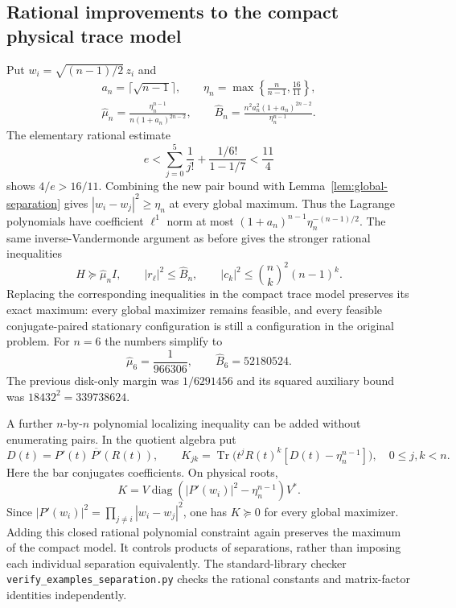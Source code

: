 \documentclass[11pt]{article}
\theoremstyle{remark}
\numberwithin{equation}{section}
\begin{document}
\subsection{Rational improvements to the compact physical trace model}
Put $w_i=\sqrt{(n-1)/2}\,z_i$ and
\[
\begin{gathered}
 a_n=\lceil\sqrt{n-1}\rceil,\qquad
 \eta_n=\max\left\{\frac n{n-1},\frac{16}{11}\right\},\\
 \widehat\mu_n=\frac{\eta_n^{n-1}}{n(1+a_n)^{2n-2}},
 \qquad
 \widehat B_n=\frac{n^2a_n^2(1+a_n)^{2n-2}}{\eta_n^{n-1}}.
\end{gathered}
\]
The elementary rational estimate
\[
 e<\sum_{j=0}^5\frac1{j!}+\frac{1/6!}{1-1/7}<\frac{11}{4}
\]
shows $4/e>16/11$. Combining the new pair bound with
Lemma~\ref{lem:global-separation} gives
$|w_i-w_j|^2\ge\eta_n$ at every global maximum.
Thus the Lagrange polynomials have coefficient $\ell^1$ norm at most
$(1+a_n)^{n-1}\eta_n^{-(n-1)/2}$.
The same inverse-Vandermonde argument as before gives the stronger
rational inequalities
\begin{equation}\label{eq:new-pair-compact-bounds}
 H\succeq\widehat\mu_n I,\qquad |r_\ell|^2\le\widehat B_n,
 \qquad |c_k|^2\le\binom nk^2(n-1)^k.
\end{equation}
Replacing the corresponding inequalities in the compact trace model
preserves its exact maximum: every global maximizer remains feasible,
and every feasible conjugate-paired stationary configuration is still
a configuration in the original problem.
For $n=6$ the numbers simplify to
\[
                  \widehat\mu_6=\frac1{966306},\qquad
                  \widehat B_6=52180524.
\]
The previous disk-only margin was $1/6291456$ and its squared
auxiliary bound was $18432^2=339738624$.

A further $n$-by-$n$ polynomial localizing inequality can be added
without enumerating pairs. In the quotient algebra put
\[
 D(t)=P'(t)\,\overline{P'}(R(t)),\qquad
 K_{jk}=\operatorname{Tr}\bigl(t^jR(t)^k
                  [D(t)-\eta_n^{n-1}]\bigr),\quad 0\le j,k<n.
\]
Here the bar conjugates coefficients. On physical roots,
\[
 K=V\operatorname{diag}\left(|P'(w_i)|^2-\eta_n^{n-1}\right)V^*.
\]
Since $|P'(w_i)|^2=\prod_{j\ne i}|w_i-w_j|^2$, one has
$K\succeq0$ for every global maximizer. Adding this closed rational
polynomial constraint again preserves the maximum of the compact
model. It controls products of separations, rather than imposing
each individual separation equivalently.
The standard-library checker \texttt{verify\_examples\_separation.py}
checks the rational constants and matrix-factor identities independently.
\end{document}
